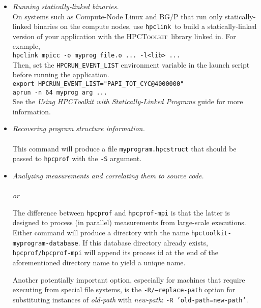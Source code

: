 \documentclass[10pt]{article}
\newcommand{\HPCToolkit}{\textsc{HPCToolkit}}
\newcommand{\hpclink}{\texttt{hpclink}}
\begin{document}
\begin{itemize}
\item{ \em Running statically-linked binaries.} \\
On systems such as Compute-Node Linux and BG/P that run only
statically-linked binaries on the compute nodes, use \hpclink\ to
build a statically-linked version of your application with the
\HPCToolkit\ library linked in.  For example, \\
\lindent
\verb|hpclink mpicc -o myprog file.o ... -l<lib> ...| \\[1ex]
Then, set the {\tt HPCRUN\_EVENT\_LIST} environment variable in the
launch script before running the application. \\
\lindent
\verb|export HPCRUN_EVENT_LIST="PAPI_TOT_CYC@4000000"| \\
\lindent
\verb|aprun -n 64 myprog arg ...| \\[1ex]
See the {\it Using {\sc HPCToolkit} with Statically-Linked Programs} guide
for more information.

\item{ \em Recovering program structure information.}\\
\\[1ex]
This command will produce a file {\tt myprogram.hpcstruct} that should be passed to {\tt hpcprof} with the {\tt -S} argument.

\item{ \em Analyzing measurements and correlating them to source code.}\\
\\
{\em or}\\

The difference between {\tt hpcprof} and {\tt hpcprof-mpi} is that the latter is designed to process (in parallel) measurements from large-scale executions.  Either command will produce a directory with the name {\tt hpctoolkit-myprogram-database}.  If this database directory already exists, {\tt hpcprof/hpcprof-mpi} will append its process id at the end of the aforementioned directory name to yield a unique name.

Another potentially important option, especially for machines that require executing from special file systems, is the {\tt -R/--replace-path} option for substituting instances of {\em old-path} with {\em new-path}: {\tt -R 'old-path=new-path'}.


\end{itemize}
\end{document}
